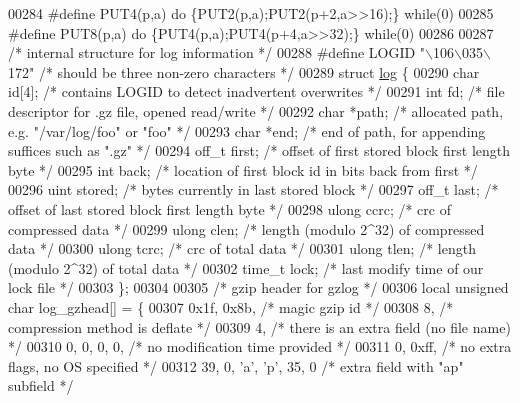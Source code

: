 \begin{DoxyCode}
00284 \textcolor{preprocessor}{#define PUT4(p,a) do \{PUT2(p,a);PUT2(p+2,a>>16);\} while(0)}
00285 \textcolor{preprocessor}{#define PUT8(p,a) do \{PUT4(p,a);PUT4(p+4,a>>32);\} while(0)}
00286 
00287 \textcolor{comment}{/* internal structure for log information */}
00288 \textcolor{preprocessor}{#define LOGID "\(\backslash\)106\(\backslash\)035\(\backslash\)172"    }\textcolor{comment}{/* should be three non-zero characters */}\textcolor{preprocessor}{}
00289 \textcolor{keyword}{struct }\hyperlink{structlog}{log} \{
00290     \textcolor{keywordtype}{char} \textcolor{keywordtype}{id}[4];     \textcolor{comment}{/* contains LOGID to detect inadvertent overwrites */}
00291     \textcolor{keywordtype}{int} fd;         \textcolor{comment}{/* file descriptor for .gz file, opened read/write */}
00292     \textcolor{keywordtype}{char} *path;     \textcolor{comment}{/* allocated path, e.g. "/var/log/foo" or "foo" */}
00293     \textcolor{keywordtype}{char} *end;      \textcolor{comment}{/* end of path, for appending suffices such as ".gz" */}
00294     off\_t first;    \textcolor{comment}{/* offset of first stored block first length byte */}
00295     \textcolor{keywordtype}{int} back;       \textcolor{comment}{/* location of first block id in bits back from first */}
00296     uint stored;    \textcolor{comment}{/* bytes currently in last stored block */}
00297     off\_t last;     \textcolor{comment}{/* offset of last stored block first length byte */}
00298     ulong ccrc;     \textcolor{comment}{/* crc of compressed data */}
00299     ulong clen;     \textcolor{comment}{/* length (modulo 2^32) of compressed data */}
00300     ulong tcrc;     \textcolor{comment}{/* crc of total data */}
00301     ulong tlen;     \textcolor{comment}{/* length (modulo 2^32) of total data */}
00302     time\_t lock;    \textcolor{comment}{/* last modify time of our lock file */}
00303 \};
00304 
00305 \textcolor{comment}{/* gzip header for gzlog */}
00306 local \textcolor{keywordtype}{unsigned} \textcolor{keywordtype}{char} log\_gzhead[] = \{
00307     0x1f, 0x8b,                 \textcolor{comment}{/* magic gzip id */}
00308     8,                          \textcolor{comment}{/* compression method is deflate */}
00309     4,                          \textcolor{comment}{/* there is an extra field (no file name) */}
00310     0, 0, 0, 0,                 \textcolor{comment}{/* no modification time provided */}
00311     0, 0xff,                    \textcolor{comment}{/* no extra flags, no OS specified */}
00312     39, 0, \textcolor{charliteral}{'a'}, \textcolor{charliteral}{'p'}, 35, 0      \textcolor{comment}{/* extra field with "ap" subfield */}

\end{DoxyCode}
